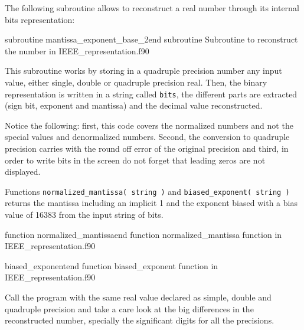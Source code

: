 The following subroutine allows to reconstruct a real number through its internal bits representation: 

\newpage
{}
{subroutine mantissa_exponent_base_2}{end subroutine}
{Subroutine to reconstruct the number in IEEE_representation.f90} 


This subroutine works by storing in a quadruple precision number any input value, 
either single, double or quadruple precision real. Then,  
the binary representation is written in a string called \texttt{bits}, 
the different parts are extracted (sign bit, exponent and mantissa) 
and the decimal value reconstructed. 

Notice the following: 
first, this code covers the normalized numbers and not the special values and denormalized numbers. 
Second, the conversion to quadruple precision carries with the round off error of the original precision and 
third, in order to write bits in the screen do not forget that leading zeros are not displayed.

Functions \texttt{normalized\_mantissa( string )} and \texttt{biased\_exponent( string )} returns the mantissa including an implicit 1 and the exponent biased with a bias value of 16383 from the input string of bits. 

{function normalized_mantissa}{end function}
{normalized_mantissa function in IEEE_representation.f90} 

{biased_exponent}{end function}
{biased_exponent function in IEEE_representation.f90} 

Call the program with the same real value declared as simple, double and quadruple precision and take a care look at the big differences in the reconstructed number, specially the significant digits for all the precisions. 







 






































